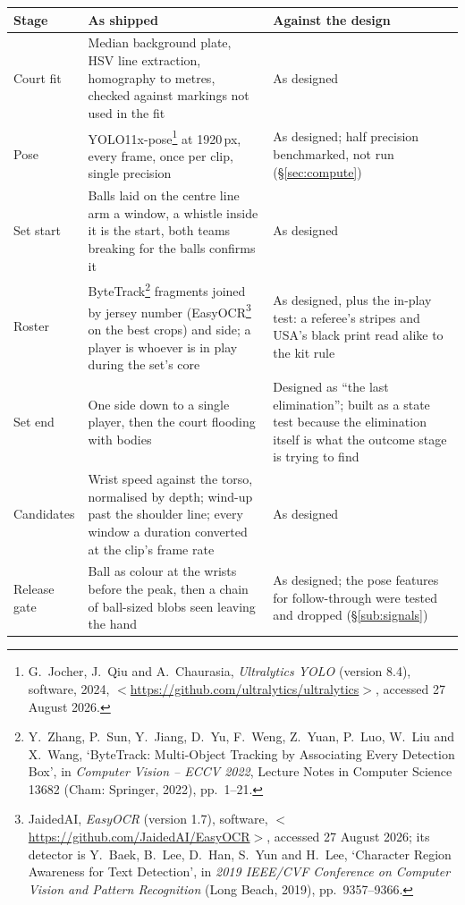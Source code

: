 \documentclass[10pt,a4paper]{article}
\begin{document}
{\footnotesize
\begin{xltabular}{\textwidth}{L{26mm} X L{40mm}}
\toprule
\textbf{Stage} & \textbf{As shipped} & \textbf{Against the design}\\
\midrule
Court fit & Median background plate, HSV line extraction, homography to metres, checked against markings not used in the fit & As designed\\
Pose & YOLO11x-pose\footnote{G.\ Jocher, J.\ Qiu and A.\ Chaurasia, \emph{Ultralytics YOLO} (version 8.4), software, 2024, $<$\url{https://github.com/ultralytics/ultralytics}$>$, accessed 27 August 2026.} at 1920\,px, every frame, once per clip, single precision & As designed; half precision benchmarked, not run (\S\ref{sec:compute})\\
Set start & Balls laid on the centre line arm a window, a whistle inside it is the start, both teams breaking for the balls confirms it & As designed\\
Roster & ByteTrack\footnote{Y.\ Zhang, P.\ Sun, Y.\ Jiang, D.\ Yu, F.\ Weng, Z.\ Yuan, P.\ Luo, W.\ Liu and X.\ Wang, `ByteTrack: Multi-Object Tracking by Associating Every Detection Box', in \emph{Computer Vision -- ECCV 2022}, Lecture Notes in Computer Science 13682 (Cham: Springer, 2022), pp.\ 1--21.} fragments joined by jersey number (EasyOCR\footnote{JaidedAI, \emph{EasyOCR} (version 1.7), software, $<$\url{https://github.com/JaidedAI/EasyOCR}$>$, accessed 27 August 2026; its detector is Y.\ Baek, B.\ Lee, D.\ Han, S.\ Yun and H.\ Lee, `Character Region Awareness for Text Detection', in \emph{2019 IEEE/CVF Conference on Computer Vision and Pattern Recognition} (Long Beach, 2019), pp.\ 9357--9366.} on the best crops) and side; a player is whoever is in play during the set's core & As designed, plus the in-play test: a referee's stripes and USA's black print read alike to the kit rule\\
Set end & One side down to a single player, then the court flooding with bodies & Designed as ``the last elimination''; built as a state test because the elimination itself is what the outcome stage is trying to find\\
Candidates & Wrist speed against the torso, normalised by depth; wind-up past the shoulder line; every window a duration converted at the clip's frame rate & As designed\\
Release gate & Ball as colour at the wrists before the peak, then a chain of ball-sized blobs seen leaving the hand & As designed; the pose features for follow-through were tested and dropped (\S\ref{sub:signals})\\

\end{xltabular}}
\end{document}

